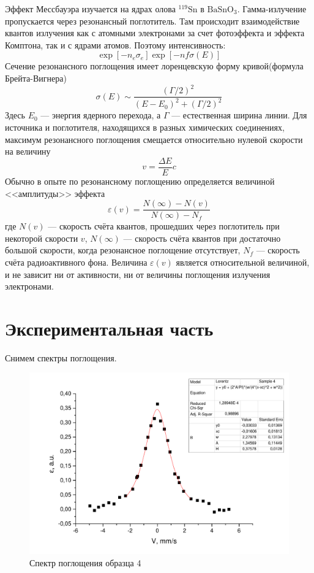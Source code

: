 \documentclass[a4paper,12pt]{article}
\newcommand{\eps}{\varepsilon}
\begin{document}
		Эффект Мессбауэра изучается на ядрах олова $\mathrm{^{119}Sn}$ в $\mathrm{BaSnO_3}$. Гамма-излучение пропускается через резонансный поглотитель. Там происходит взаимодействие квантов излучения как с атомными электронами за счет фотоэффекта и эффекта Комптона, так и с ядрами атомов. Поэтому интенсивность:
		\begin{equation}
			\exp\left[-n_e\sigma_e\right]\exp\left[-nf\sigma(E)\right]
		\end{equation}
		Сечение резонансного поглощения имеет лоренцевскую форму кривой(формула Брейта-Вигнера)
		\begin{equation}
			\sigma(E) \sim \frac{\left(\Gamma/2\right)^2}{\left(E-E_0\right)^2 + \left(\Gamma/2\right)^2}
		\end{equation}
		Здесь $E_0$ --- энергия ядерного перехода, а $\Gamma$ --- естественная ширина линии.
		Для источника и поглотителя, находящихся в разных химических соединениях, максимум резонансного поглощения смещается относительно нулевой скорости на величину
		\begin{equation}
			v = \frac{\Delta E}{E}c
		\end{equation}
		Обычно в опыте по резонансному поглощению определяется величиной <<амплитуды>> эффекта
		\begin{equation}
			\eps(v) = \frac{N(\infty)-N(v)}{N(\infty)-N_f}
		\end{equation}
		где $N(v)$ --- скорость счёта квантов, прошедших через поглотитель при некоторой скорости $v$, $N(\infty)$ --- скорость счёта квантов при достаточно большой скорости, когда резонансное поглощение отсутствует, $N_f$ --- скорость счёта радиоактивного фона. Величина $\eps(v)$ является относительной величиной, и не зависит ни от активности, ни от величины поглощения излучения электронами.
		
		\section{Экспериментальная часть}
			Снимем спектры поглощения.
			\begin{figure}[h!]
				\centering
				\includegraphics[width=1.1\linewidth]{sample4}
				\caption{Спектр поглощения образца 4}
			\end{figure}
			
\end{document}
